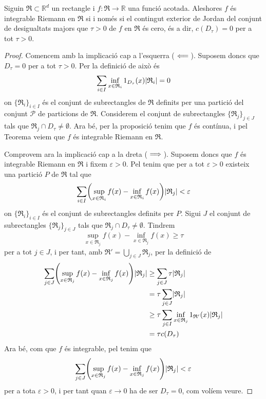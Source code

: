 \documentclass[../Apunts.tex]{subfiles}
\begin{document}
	\begin{theorem}
		Siguin \(\mathfrak{R}\subset\mathbb{R}^{d}\) un rectangle i \(f\colon\mathfrak{R}\to\mathbb{R}\) una funció acotada. Aleshores \(f\) és integrable Riemann en \(\mathfrak{R}\) si i només si el contingut exterior de Jordan del conjunt de desigualtats majors que \(\tau>0\) de \(f\) en \(\mathfrak{R}\) és cero, és a dir, \(c(D_{\tau})=0\) per a tot \(\tau>0\).
		\begin{proof}
			Comencem amb la implicació cap a l'esquerra (\(\impliedby\)). Suposem doncs que \(D_{\tau}=0\) per a tot \(\tau>0\). Per la definició de  això és
			\[\sum_{i\in I}\inf_{x\in \mathfrak{R}_{i}}1_{D_{\tau}}(x)\abs{\mathfrak{R}_{i}}=0\]
			on \(\{\mathfrak{R}_{i}\}_{i\in I}\) és el conjunt de subrectangles de \(\mathfrak{R}\) definits per una partició del conjunt \(\mathcal{P}\) de particions de \(\mathfrak{R}\). Considerem el conjunt de subrectangles \(\{\mathfrak{R}_{j}\}_{j\in J}\) tals que \(\mathfrak{R}_{j}\cap D_{\tau}\neq\emptyset\). Ara bé, per la proposició  tenim que \(f\) és contínua, i pel Teorema  veiem que \(f\) és integrable Riemann en \(\mathfrak{R}\).
			
			Comprovem ara la implicació cap a la dreta (\(\implies\)). Suposem doncs que \(f\) és integrable Riemann en \(\mathfrak{R}\) i fixem \(\varepsilon>0\). Pel  tenim que per a tot \(\varepsilon>0\) existeix una partició \(P\) de \(\mathfrak{R}\) tal que
			\[\sum_{i\in I}\left(\sup_{x\in \mathfrak{R}_{i}}f(x)-\inf_{x\in \mathfrak{R}_{i}}f(x)\right)\abs{\mathfrak{R}_{j}}<\varepsilon\]
			on \(\{\mathfrak{R}_{i}\}_{i\in I}\) és el conjunt de subrectangles definits per \(P\). Sigui \(J\) el conjunt de subrectangles \(\{\mathfrak{R}_{j}\}_{j\in J}\) tals que \(\mathfrak{R}_{j}\cap D_{\tau}\neq\emptyset\). Tindrem
			\[\sup_{x\in \mathfrak{R}_{j}}f(x)-\inf_{x\in \mathfrak{R}_{j}}f(x)\geq\tau\]
			per a tot \(j\in J\), i per tant, amb \(\mathfrak{R}'=\bigcup_{j\in J}\mathfrak{R}_{j}\), per la definició de 
			\begin{align*}
			\sum_{j\in J}\left(\sup_{x\in \mathfrak{R}_{j}}f(x)-\inf_{x\in \mathfrak{R}_{j}}f(x)\right)\abs{\mathfrak{R}_{j}}&\geq\sum_{j\in J}\tau\abs{\mathfrak{R}_{j}}\\
			&=\tau\sum_{j\in J}\abs{\mathfrak{R}_{j}}\\
			&\geq\tau\sum_{j\in I}\inf_{x\in \mathfrak{R}_{j}}1_{\mathfrak{R}'}(x)\abs{\mathfrak{R}_{j}}\\
			&=\tau c(D_{\tau})
			\end{align*}
			Ara bé, com que \(f\) és integrable, pel  tenim que
			\[\sum_{j\in J}\left(\sup_{x\in \mathfrak{R}_{j}}f(x)-\inf_{x\in \mathfrak{R}_{j}}f(x)\right)\abs{\mathfrak{R}_{j}}<\varepsilon\]
			per a tota \(\varepsilon>0\), i per tant quan \(\varepsilon\to0\) ha de ser \(D_{\tau}=0\), com volíem veure.
		\end{proof}
	\end{theorem}
\end{document}
